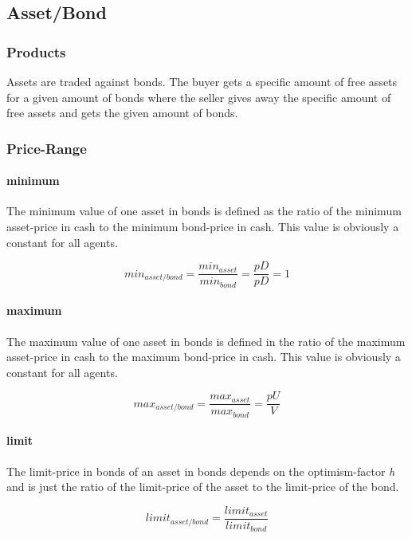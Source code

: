 \documentclass[Bachelorarbeit.tex]{subfiles}
\begin{document}
\subsection{Asset/Bond}
\label{sec:ASSET_BOND_MARKET}
\subsubsection{Products}
Assets are traded against bonds. The buyer gets a specific amount of free assets for a given amount of bonds where the seller gives away the specific amount of free assets and gets the given amount of bonds.

\subsubsection{Price-Range}

\paragraph{minimum}
The minimum value of one asset in bonds is defined as the ratio of the minimum asset-price in cash to the minimum bond-price in cash. This value is obviously a constant for all agents.

\begin{equation}
min_{asset/bond} = \frac{min_{asset}}{min_{bond}} = \frac{pD}{pD} = 1
\end{equation}
 
\paragraph{maximum}
The maximum value of one asset in bonds is defined in the ratio of the maximum asset-price in cash to the maximum bond-price in cash. This value is obviously a constant for all agents.

\begin{equation}
max_{asset/bond} = \frac{max_{asset}}{max_{bond}} = \frac{pU}{V}
\end{equation}

\paragraph{limit}
The limit-price in bonds of an asset in bonds depends on the optimism-factor \textit{h} and is just the ratio of the limit-price of the asset to the limit-price of the bond.

\begin{equation}
limit_{asset/bond} = \frac{limit_{asset}}{limit_{bond}}
\end{equation}
\end{document}
